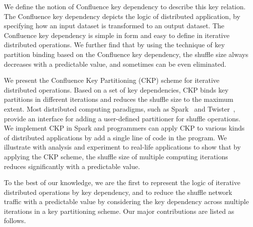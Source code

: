 \documentclass[10pt,journal,compsoc]{IEEEtran}
\begin{document}
We define the notion of Confluence key dependency to describe this key relation.
The Confluence key dependency depicts the logic of distributed application, by specifying how an input dataset is transformed 
to an output dataset. 
The Confluence key dependency is simple in form and easy to define in iterative distributed operations.
We further find that by using the technique of key partition binding 
based on the Confluence key dependency, the shuffle size 
always decreases with a predictable value, 
and sometimes can be even eliminated.

We present the Confluence Key Partitioning (CKP) scheme for iterative distributed operations. 
Based on a set of key dependencies, CKP binds key partitions in 
different iterations and reduces the shuffle size to the maximum
extent. 
Most distributed computing paradigms, such as Spark~\cite{zaharia2012resilient} and Twister~\cite{ekanayake2010twister},
provide an interface for adding a user-defined partitioner for shuffle operations.
We implement CKP in Spark and programmers can apply CKP to various 
kinds of distributed applications by add a single line of code
in the program.
We illustrate with analysis and experiment to real-life applications 
to show that by applying the CKP scheme, 
the shuffle size of multiple computing
iterations reduces significantly with a predictable value. %

To the best of our knowledge, we are the first to 
represent the logic of iterative distributed operations
by key dependency, and to reduce the 
shuffle network traffic with a predictable value by considering the key dependency 
across multiple iterations in a key partitioning scheme.
Our major contributions are listed as follows.
\end{document}
